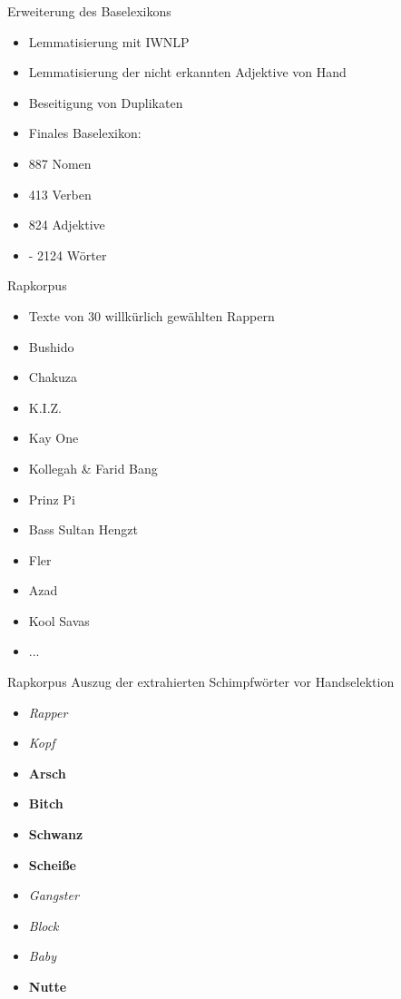 \documentclass{beamer}
\begin{document}
\begin{frame}{Erweiterung des Baselexikons}
	\begin{itemize}

		\item Lemmatisierung mit IWNLP
		\item Lemmatisierung der nicht erkannten Adjektive von Hand
		\item Beseitigung von Duplikaten
		\item Finales Baselexikon:
		\item 887 Nomen
		\item 413 Verben
		\item 824 Adjektive
		\item  - 2124 Wörter

	\end{itemize}
\end{frame}

\begin{frame}{Rapkorpus}
\begin{itemize}
\item Texte von 30 willkürlich gewählten Rappern
	\item Bushido
	\item Chakuza
	\item K.I.Z.
	\item Kay One
	\item Kollegah \& Farid Bang
	\item Prinz Pi
	\item Bass Sultan Hengzt
	\item Fler
	\item Azad
	\item Kool Savas
	\item ...

\end{itemize}
\end{frame}

\begin{frame}{Rapkorpus}
Auszug der extrahierten Schimpfwörter vor Handselektion
\begin{itemize}
		
\item \emph{Rapper}
\item \emph{Kopf}
\item \textbf{Arsch}
\item \textbf{Bitch}
\item \textbf{Schwanz}
\item \textbf{Scheiße}
\item \emph{Gangster}
\item \emph{Block}
\item \emph{Baby}
\item \textbf{Nutte}
		
\end{itemize}
\end{frame}
\end{document}
